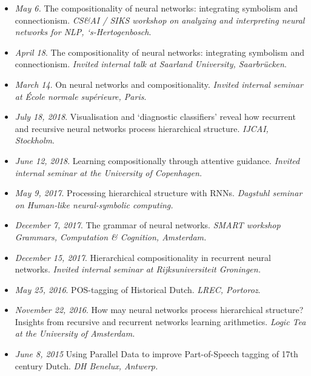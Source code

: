 \begin{itemize}
    \item \textit{May 6.} The compositionality of neural networks: integrating symbolism and connectionism. \textit{CS\&AI / SIKS workshop on analyzing and interpreting neural networks for NLP, ‘s-Hertogenbosch}.
    \item \textit{April 18}. The compositionality of neural networks: integrating symbolism and connectionism. \textit{Invited internal talk at Saarland University, Saarbrücken}.
    \item \textit{March 14}. On neural networks and compositionality. \textit{Invited internal seminar at École normale supérieure, Paris}.
    \item \textit{July 18, 2018}. Visualisation and ‘diagnostic classifiers’ reveal how recurrent and recursive neural networks process hierarchical structure. \textit{IJCAI, Stockholm}.
    \item \textit{June 12, 2018}. Learning compositionally through attentive guidance. \textit{Invited internal seminar at the University of Copenhagen.}
    \item \textit{May 9, 2017}. Processing hierarchical structure with RNNs.\textit{ Dagstuhl seminar on Human-like neural-symbolic computing.}
    \item \textit{December 7, 2017}. The grammar of neural networks. \textit{SMART workshop Grammars, Computation \& Cognition, Amsterdam.}
    \item \textit{December 15, 2017}. Hierarchical compositionality in recurrent neural networks. \textit{Invited internal seminar at Rijksuniversiteit Groningen.}
    \item \textit{May 25, 2016}. POS-tagging of Historical Dutch. \textit{LREC, Portoroz}.
    \item \textit{November 22, 2016}. How may neural networks process hierarchical structure? Insights from recursive and recurrent networks learning arithmetics. \textit{Logic Tea at the University of Amsterdam.}
    \item \textit{June 8, 2015} Using Parallel Data to improve Part-of-Speech tagging of 17th century Dutch. \textit{DH Benelux, Antwerp.}
\end{itemize}

